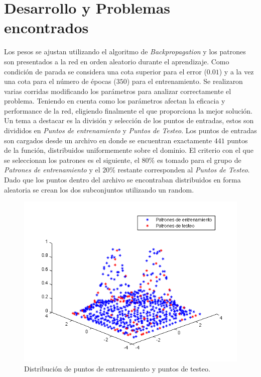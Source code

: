 \documentclass{sig-alternate}
\begin{document}
\section*{Desarrollo y Problemas encontrados}

	Los pesos se ajustan utilizando el algoritmo de \textit{Backpropagation} y los patrones son presentados a la red en orden aleatorio durante el aprendizaje. Como condición de parada se considera una cota superior para el error ($0.01$) y a la vez una cota para el número de épocas ($350$) para el entrenamiento. Se realizaron varias corridas modificando los parámetros para analizar correctamente el problema. Teniendo en cuenta como los parámetros afectan la eficacia y performance de la red, eligiendo finalmente el que proporciona la mejor solución.\\

	Un tema a destacar es la división y selección de los puntos de entradas, estos son divididos en \textit{Puntos de entrenamiento} y \textit{Puntos de Testeo}. Los puntos de entradas son cargados desde un archivo en donde se encuentran exactamente $441$ puntos de la función, distribuidos uniformemente sobre el dominio. El criterio con el que se seleccionan los patrones es el siguiente, el $80\%$ es tomado para el grupo de \textit{Patrones de entrenamiento} y el $20\%$ restante corresponden al \textit{Puntos de Testeo}. Dado que los puntos dentro del archivo se encontraban distribuidos en forma aleatoria se crean los dos subconjuntos utilizando un random.

	\begin{figure}[!ht]
		\includegraphics[scale=0.5]{./figures/muestreo.png}
	  	\caption{Distribución de puntos de entrenamiento y puntos de testeo.}
	  	\label{fig:input}
	\end{figure}
	
\end{document}
